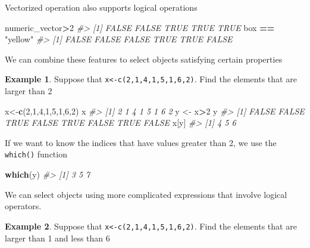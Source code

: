 \documentclass[
]{book}
\newenvironment{Shaded}{\begin{snugshade}}{\end{snugshade}}
\newcommand{\CommentTok}[1]{\textcolor[rgb]{0.56,0.35,0.01}{\textit{#1}}}
\newcommand{\DecValTok}[1]{\textcolor[rgb]{0.00,0.00,0.81}{#1}}
\newcommand{\FunctionTok}[1]{\textcolor[rgb]{0.13,0.29,0.53}{\textbf{#1}}}
\newcommand{\NormalTok}[1]{#1}
\newcommand{\OtherTok}[1]{\textcolor[rgb]{0.56,0.35,0.01}{#1}}
\newcommand{\SpecialCharTok}[1]{\textcolor[rgb]{0.81,0.36,0.00}{\textbf{#1}}}
\newcommand{\StringTok}[1]{\textcolor[rgb]{0.31,0.60,0.02}{#1}}
\theoremstyle{definition}
\theoremstyle{definition}
\newtheorem{example}{Example}[chapter]
\theoremstyle{definition}
\theoremstyle{definition}
\theoremstyle{remark}
\begin{document}
Vectorized operation also supports logical operations

\begin{Shaded}
\begin{Highlighting}[]
\NormalTok{numeric\_vector}\SpecialCharTok{\textgreater{}}\DecValTok{2}
\CommentTok{\#\textgreater{} [1] FALSE FALSE  TRUE  TRUE  TRUE}
\NormalTok{box }\SpecialCharTok{==} \StringTok{"yellow"}
\CommentTok{\#\textgreater{} [1] FALSE FALSE FALSE  TRUE  TRUE FALSE}
\end{Highlighting}
\end{Shaded}

We can combine these features to select objects satisfying certain properties

\begin{example}
Suppose that \texttt{x\textless{}-c(2,1,4,1,5,1,6,2)}. Find the elements that are larger than 2
\end{example}

\begin{Shaded}
\begin{Highlighting}[]
\NormalTok{x}\OtherTok{\textless{}{-}}\FunctionTok{c}\NormalTok{(}\DecValTok{2}\NormalTok{,}\DecValTok{1}\NormalTok{,}\DecValTok{4}\NormalTok{,}\DecValTok{1}\NormalTok{,}\DecValTok{5}\NormalTok{,}\DecValTok{1}\NormalTok{,}\DecValTok{6}\NormalTok{,}\DecValTok{2}\NormalTok{)}
\NormalTok{x}
\CommentTok{\#\textgreater{} [1] 2 1 4 1 5 1 6 2}
\NormalTok{y }\OtherTok{\textless{}{-}}\NormalTok{ x}\SpecialCharTok{\textgreater{}}\DecValTok{2}
\NormalTok{y}
\CommentTok{\#\textgreater{} [1] FALSE FALSE  TRUE FALSE  TRUE FALSE  TRUE FALSE}
\NormalTok{x[y]}
\CommentTok{\#\textgreater{} [1] 4 5 6}
\end{Highlighting}
\end{Shaded}

If we want to know the indices that have values greater than 2, we use the \texttt{which()} function

\begin{Shaded}
\begin{Highlighting}[]
\FunctionTok{which}\NormalTok{(y)}
\CommentTok{\#\textgreater{} [1] 3 5 7}
\end{Highlighting}
\end{Shaded}

We can select objects using more complicated expressions that involve logical operators.

\begin{example}
Suppose that \texttt{x\textless{}-c(2,1,4,1,5,1,6,2)}. Find the elements that are larger than 1 and less than 6
\end{example}
\end{document}

